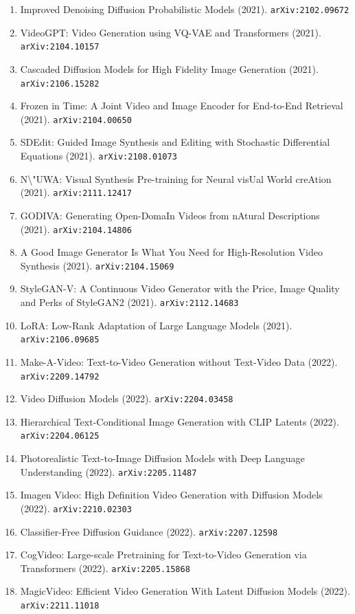 \documentclass[11pt]{article}
\begin{document}
\begin{enumerate}
  Text-Guided Diffusion Models (2021). \texttt{arXiv:2112.10741}
  \item Improved Denoising Diffusion Probabilistic Models (2021). \texttt{arXiv:2102.09672}
  \item VideoGPT: Video Generation using VQ-VAE and Transformers (2021). \texttt{arXiv:2104.10157}
  \item Cascaded Diffusion Models for High Fidelity Image Generation (2021). \texttt{arXiv:2106.15282}
  \item Frozen in Time: A Joint Video and Image Encoder for End-to-End Retrieval (2021). \texttt{arXiv:2104.00650}
  \item SDEdit: Guided Image Synthesis and Editing with Stochastic Differential
  Equations (2021). \texttt{arXiv:2108.01073}
  \item N\textbackslash{}"UWA: Visual Synthesis Pre-training for Neural visUal World creAtion (2021). \texttt{arXiv:2111.12417}
  \item GODIVA: Generating Open-DomaIn Videos from nAtural Descriptions (2021). \texttt{arXiv:2104.14806}
  \item A Good Image Generator Is What You Need for High-Resolution Video
  Synthesis (2021). \texttt{arXiv:2104.15069}
  \item StyleGAN-V: A Continuous Video Generator with the Price, Image Quality
  and Perks of StyleGAN2 (2021). \texttt{arXiv:2112.14683}
  \item LoRA: Low-Rank Adaptation of Large Language Models (2021). \texttt{arXiv:2106.09685}
  \item Make-A-Video: Text-to-Video Generation without Text-Video Data (2022). \texttt{arXiv:2209.14792}
  \item Video Diffusion Models (2022). \texttt{arXiv:2204.03458}
  \item Hierarchical Text-Conditional Image Generation with CLIP Latents (2022). \texttt{arXiv:2204.06125}
  \item Photorealistic Text-to-Image Diffusion Models with Deep Language
  Understanding (2022). \texttt{arXiv:2205.11487}
  \item Imagen Video: High Definition Video Generation with Diffusion Models (2022). \texttt{arXiv:2210.02303}
  \item Classifier-Free Diffusion Guidance (2022). \texttt{arXiv:2207.12598}
  \item CogVideo: Large-scale Pretraining for Text-to-Video Generation via
  Transformers (2022). \texttt{arXiv:2205.15868}
  \item MagicVideo: Efficient Video Generation With Latent Diffusion Models (2022). \texttt{arXiv:2211.11018}

\end{enumerate}
\end{document}
